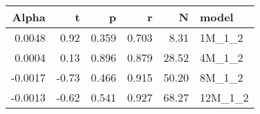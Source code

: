 \begin{table}[ht]
\centering
\begin{tabular}{rrrrrl}
  \hline
Alpha & t & p & r & N & model \\ 
  \hline
0.0048 & 0.92 & 0.359 & 0.703 & 8.31 & 1M\_1\_2 \\ 
  0.0004 & 0.13 & 0.896 & 0.879 & 28.52 & 4M\_1\_2 \\ 
  -0.0017 & -0.73 & 0.466 & 0.915 & 50.20 & 8M\_1\_2 \\ 
  -0.0013 & -0.62 & 0.541 & 0.927 & 68.27 & 12M\_1\_2 \\ 
   \hline
\end{tabular}
\end{table}

